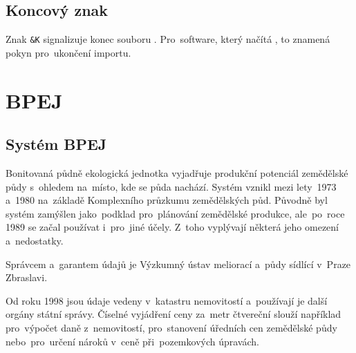 
\subsection{Koncový znak}
\label{koncovy_znak}

Znak \texttt{\&K} signalizuje konec souboru . Pro~software,
který načítá , to znamená pokyn pro~ukončení importu.

\section{BPEJ}
\label{bpej}

\subsection{Systém BPEJ}
\label{system_bpej}

Bonitovaná půdně ekologická jednotka vyjadřuje produkční potenciál
zemědělské půdy s~ohledem na~místo, kde se půda nachází. Systém
 vznikl mezi lety~1973 a~1980 na~základě Komplexního průzkumu
zemědělských půd. Původně byl systém  zamýšlen jako~podklad
pro~plánování zemědělské produkce, ale~po~roce 1989 se začal používat
i~pro~jiné účely. Z~toho vyplývají některá jeho omezení a~nedostatky.

Správcem a~garantem údajů  je Výzkumný ústav meliorací a~půdy
sídlící v~Praze Zbraslavi.

Od roku 1998 jsou údaje  vedeny v~katastru nemovitostí
a~používají je další orgány státní správy. Číselné vyjádření ceny
 za~metr čtvereční slouží například pro~výpočet daně
z~nemovitostí, pro~stanovení úředních cen zemědělské půdy
nebo~pro~určení nároků v~ceně při~pozemkových úpravách.

